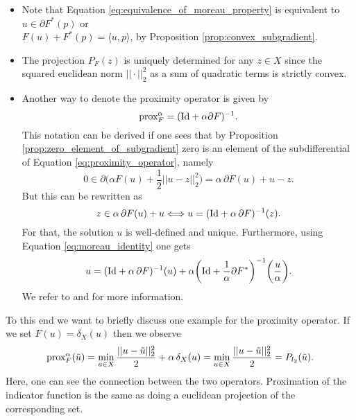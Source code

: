     \begin{remark}
        \begin{itemize}
            \item Note that Equation \ref{eq:equivalence_of_moreau_property} is equivalent to $u \in \partial F^{\ast}(p)$ or\\
            $F(u) + F^{\ast}(p) = \langle u, p \rangle$, by Proposition \ref{prop:convex_subgradient}.
            \item The projection $P_{F}(z)$ is uniquely determined for any $z \in X$ since the squared euclidean norm $||\cdot||_{2}^{2}$ as a sum of quadratic terms is strictly convex.
            \item Another way to denote the proximity operator is given by
                \begin{equation}
                    \textnormal{prox}^{\alpha}_{F} = (\textnormal{Id} + \alpha \partial F)^{-1}.
                    \label{eq:proximity_operator_reloaded}
                \end{equation}
            This notation can be derived if one sees that by Proposition \ref{prop:zero_element_of_subgradient} zero is an element of the subdifferential of Equation \ref{eq:proximity_operator}, namely
                $$
                    0 \in \partial \big( \alpha F(u) + \frac{1}{2} ||u - z||_{2}^{2} \big) = \alpha \, \partial F(u) + u - z.
                $$
            But this can be rewritten as
                $$
                    z \in \alpha\,\partial F(u) + u \Longleftrightarrow u = (\textnormal{Id} + \alpha \, \partial F)^{-1}(z).
                $$
            For that, the solution $u$ is well-defined and unique. Furthermore, using Equation \ref{eq:moreau_identity} one gets
                \begin{equation}
                    u = (\textnormal{Id} + \alpha \, \partial F)^{-1}(u) + \alpha \bigg( \textnormal{Id} + \frac{1}{\alpha} \partial F^{\ast} \bigg)^{-1} \bigg(\frac{u}{\alpha}\bigg).
                    \label{eq:moreau_identity_reloaded}
                \end{equation}
            We refer to \cite{Rockafellar} and \cite{Chambolle-et-al-10} for more information.
        \end{itemize}
    \end{remark}

    \begin{example}
        To this end we want to briefly discuss one example for the proximity operator. If we set $F(u) = \delta_{X}(u)$ then we observe
            $$
                \textnormal{prox}^{\alpha}_{F}(\tilde{u}) = \min\limits_{u \in X} \frac{||u - \tilde{u}||_{2}^{2}}{2} + \alpha \, \delta_{X}(u) = \min\limits_{u \in X} \frac{||u - \tilde{u}||_{2}^{2}}{2} = P_{l_{2}}(\tilde{u}).
            $$
        Here, one can see the connection between the two operators. Proximation of the indicator function is the same as doing a euclidean projection of the corresponding set.
    \label{ex:proximity_operator}
    \end{example}

